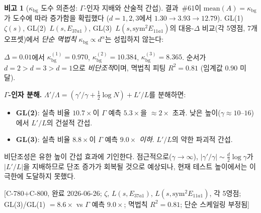 \documentclass[11pt, a4paper]{article}
\theoremstyle{definition}
\newtheorem{remark}{비고}[section]
\theoremstyle{plain}
\begin{document}
\begin{remark}[$\kappa_{\mathrm{bg}}$ 도수 의존성: $\Gamma$-인자 지배와 산술적 간섭]
\label{rem:kappa_bg_degree_mechanism}
결과~\#61이 $\mathrm{mean}(A) = \kappa_{\mathrm{bg}}$가 도수에 따라
증가함을 확립했다 ($d=1,2,3$에서 $1.30 \to 3.93 \to 12.79$).
GL(1)~$\zeta(s)$, GL(2)~$L(s, E_{37a1})$, GL(3)~$L(s, \mathrm{sym}^2 E_{11a1})$의
대응-$\Delta$ 비교(각 5영점, 7개 오프셋)에서
\emph{단순 멱법칙} $\kappa_{\mathrm{bg}} \propto d^\alpha$는 성립하지 않는다:

\smallskip\noindent
$\Delta = 0.01$에서 $\kappa_{\mathrm{bg}}^{(1)} = 0.970$,
$\kappa_{\mathrm{bg}}^{(2)} = 10.384$,
$\kappa_{\mathrm{bg}}^{(3)} = 8.365$.
순서가 $d{=}2 > d{=}3 > d{=}1$으로 \emph{비단조적}이며,
멱법칙 피팅 $R^2 = 0.81$ (임계값 $0.90$ 미달).

\smallskip\noindent
\textbf{$\Gamma$-인자 분해.}\;
$\Lambda'/\Lambda = (\gamma'/\gamma + \tfrac{1}{2}\log N) + L'/L$를 분해하면:
\begin{itemize}[nosep]
\item \textbf{GL(2)}: 실측 비율 $10.7\times$이 $\Gamma$ 예측 $5.3\times$을 ${\approx}2\times$ 초과.
  낮은 높이($\gamma \approx 10$--$16$)에서 $L'/L$의 건설적 간섭.
\item \textbf{GL(3)}: 실측 비율 $8.8\times$이 $\Gamma$ 예측 $9.0\times$ \emph{이하}.
  $L'/L$의 약한 파괴적 간섭.
\end{itemize}
비단조성은 유한 높이 간섭 효과에 기인한다.
점근적으로($\gamma \to \infty$), $|\gamma'/\gamma| \sim \tfrac{d}{2}\log\gamma$가
$|L'/L|$을 지배하므로 단조 증가가 회복될 것으로 예상되나,
현재 테스트 높이에서는 이 극한에 도달하지 못했다.

[C-780$+$C-800, 완료 2026-06-26;
$\zeta$, $L(s,E_{37a1})$, $L(s,\mathrm{sym}^2 E_{11a1})$, 각 5영점;
GL(3)/GL(1) $= 8.6\times$ vs $\Gamma$ 예측 $9.0\times$;
멱법칙 $R^2{=}0.81$; 단순 스케일링 부정됨]
\end{remark}
\end{document}
